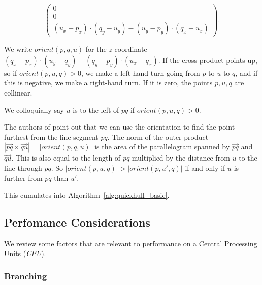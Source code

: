 \[
    \begin{pmatrix}
        0 \\
        0 \\
        (u_x - p_x) \cdot (q_y - u_y) - (u_y - p_y) \cdot (q_x - u_x)
    \end{pmatrix}.
\]

We write $orient(p, q, u)$ for the $z$-coordinate
$(q_x - p_x) \cdot (u_y - q_y) - (q_y - p_y) \cdot (u_x - q_x)$. 
If the cross-product points up, so if $orient(p, u, q) > 0$, we make a left-hand 
turn going from $p$ to $u$ to $q$, and if this is negative, we make a right-hand
turn. If it is zero, the points $p, u, q$ are collinear. 

We colloquially say $u$ is to the left of $pq$ if $orient(p, u, q) > 0$.

The authors of \cite{quickerthanqhull} point out that we can use the 
orientation to find the point furthest from the line segment $pq$. 
The norm of the outer product
$|\vec{pq} \times \vec{qu}| = |orient(p, q, u)|$ is the area of the
parallelogram spanned by $\vec{pq}$ and $\vec{qu}$. This is also equal to
the length of $pq$ multiplied by the distance from $u$ to the line through 
$pq$. So $|orient(p, u, q)| > |orient(p, u', q)|$ if and only if $u$ is further
from $pq$ than $u'$.

This cumulates into Algorithm~\ref{alg:quickhull_basic}. 

\subsection{Perfomance Considerations}

We review some factors that are relevant to performance on a Central Processing
Units (\textit{CPU}).

\subsubsection{Branching}

